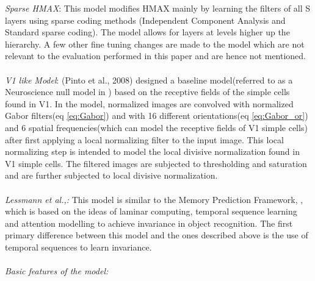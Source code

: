 \documentclass[12pt,twoside]{article}
\theoremstyle{plain}
\theoremstyle{definition}
\theoremstyle{remark}
\begin{document}
\textit{Sparse HMAX}\cite{XiaolinHu2014}: This model modifies HMAX\cite{MaximilianRiesenhuber1999} mainly by learning the filters of all S layers using sparse coding methods (Independent Component Analysis\cite{AapoHyvaerinen2009} and Standard sparse coding\cite{XiaolinHu2014}). The model allows for layers at levels higher up the hierarchy. A few other fine tuning changes are made to the model which are not relevant to the evaluation performed in this paper and are hence not mentioned.\\\\
\textit{V1 like Model}\cite{NicolasPinto2008}: (Pinto et al., 2008) designed a baseline model(referred to as a Neuroscience null model in \cite{NicolasPinto2008}) based on the receptive fields of the simple cells found in V1. In the model, normalized images are convolved with normalized Gabor filters(eq \ref{eq:Gabor}) and with 16 different orientations(eq \ref{eq:Gabor_or}) and 6 spatial frequencies(which can model the receptive fields of V1 simple cells\citep{BrunoA.Olshausen1996}) after first applying a local normalizing filter to the input image. This local normalizing step is intended to model the local divisive normalization found in V1 simple cells\cite{Heeger1992}. The filtered images are subjected to thresholding and saturation and are further subjected to local divisive normalization.\\\\
\textit{Lessmann et al.,: } This model is similar to the Memory Prediction Framework\cite{Hawkins2004}, \cite{DileepGeorge2009}, \cite{George2008} which is based on the ideas of laminar computing, temporal sequence learning and attention modelling to achieve invariance in object recognition. The first primary difference between this model and the ones described above is the use of temporal sequences to learn invariance.\\\\
\textit{Basic features of the model: } 
\end{document}
